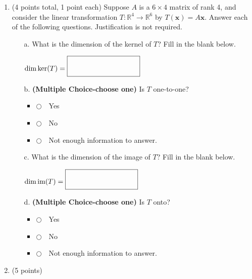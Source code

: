 \documentclass[12pt]{extarticle}
\newcommand{\chooseone}{{\Large$\Circle$\ \ }}
\begin{document}
\begin{enumerate}
\item (4 points total, 1 point each) Suppose $A$ is a $6\times 4$ matrix of rank 4, and consider the linear transformation $T:\mathbb{R}^4\to \mathbb{R}^6$ by $T(\mathbf{x})=A\mathbf{x}$. Answer each of the following questions. Justification is not required.

\begin{itemize}
\item[a.]  What is the dimension of the kernel of $T$? Fill in the blank below.

  \vspace{0.5in}
  
$\dim \ker(T)= \boxed{\Huge\phantom{qqqqqqM}} $

  \vspace{0.5in}

\item[b.] \textbf{(Multiple Choice-choose one)}   Is $T$ one-to-one?
\begin{itemize}[label={}]
\item \chooseone Yes
\item \chooseone No
\item \chooseone Not enough information to answer.
\end{itemize}    

\bigskip

\item[c.]   What is the dimension of the image of $T$? Fill in the blank below.

  \vspace{0.5in}
  
$\dim \text{im}(T)= \boxed{\Huge\phantom{qqqqqqM}} $

  \vspace{0.5in}

\item[d.] \textbf{(Multiple Choice-choose one)}  Is $T$ onto?
\begin{itemize}[label={}]
\item \chooseone Yes
\item \chooseone No
\item \chooseone Not enough information to answer.
\end{itemize}   

 \end{itemize}
    
  



\newpage


\item (5 points) 


\end{enumerate}
\end{document}
